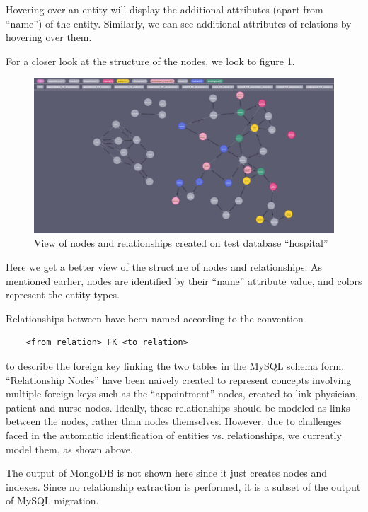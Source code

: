 \documentclass[12pt]{article}
\begin{document}
    Hovering over an entity will display the additional attributes (apart from ``name'') of the entity. Similarly, we can see additional attributes of relations by hovering over them. 

    For a closer look at the structure of the nodes, we look to figure \ref{fig:node_subset}.

    \begin{figure}[htb!]
        \centering
        \includegraphics[width=155mm]{img/created_nodes.png}
        \caption{View of nodes and relationships created on test database ``hospital''}
        \label{fig:node_subset}
    \end{figure}

    Here we get a better view of the structure of nodes and relationships. As mentioned earlier, nodes are identified by their ``name'' attribute value, and colors represent the entity types. 

    Relationships between have been named according to the convention 
    \begin{lstlisting}
    <from_relation>_FK_<to_relation>    
    \end{lstlisting} 
    to describe the foreign key linking the two tables in the MySQL schema form. ``Relationship Nodes'' have been naively created to represent concepts involving multiple foreign keys such as the ``appointment'' nodes, created to link physician, patient and nurse nodes. Ideally, these relationships should be modeled as links between the nodes, rather than nodes themselves. However, due to challenges faced in the automatic identification of entities vs. relationships, we currently model them, as shown above.

    The output of MongoDB is not shown here since it just creates nodes and indexes. Since no relationship extraction is performed, it is a subset of the output of MySQL migration.
\end{document}
